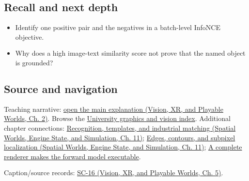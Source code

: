 \subsection{Recall and next depth}\label{appendix-772f1fd96148-recall-and-next-depth}

\begin{itemize}
\tightlist
\item
  Identify one positive pair and the negatives in a batch-level InfoNCE objective.
\item
  Why does a high image-text similarity score not prove that the named object is grounded?
\end{itemize}

\subsection{Source and navigation}\label{appendix-772f1fd96148-source-and-navigation}

Teaching narrative: \href{../07-Vision-XR-and-Playable-Worlds/main.pdf\#nameddest=04-visual-computing-ii-ch031-self-supervision-and-evaluation}{open the main explanation (Vision, XR, and Playable Worlds, Ch. 2)}. Browse the \hyperref[appendix-a6d556a4ef50-university-graphics-vision-and-photography---independent-series]{University graphics and vision index}. Additional chapter connections: \href{../05-Spatial-Worlds-Engine-State-and-Simulation/main.pdf\#nameddest=04-visual-computing-ii-ch030-recognition-templates-and-industrial-matching}{Recognition, templates, and industrial matching (Spatial Worlds, Engine State, and Simulation, Ch. 11)}; \href{../05-Spatial-Worlds-Engine-State-and-Simulation/main.pdf\#nameddest=04-visual-computing-ii-ch030-edges-contours-and-subpixel-localization}{Edges, contours, and subpixel localization (Spatial Worlds, Engine State, and Simulation, Ch. 11)}; \hyperref[04-visual-computing-ii-ch035-a-complete-renderer-makes-the-forward-model-executable]{A complete renderer makes the forward model executable}.

Caption/source records: \href{../07-Vision-XR-and-Playable-Worlds/main.pdf\#nameddest=04-visual-computing-ii-ch036-sc-16---stanford-cs231n-deep-learning-for-computer-vision-spring-2025-lecture-16-vision-and-language}{SC-16 (Vision, XR, and Playable Worlds, Ch. 5)}.
